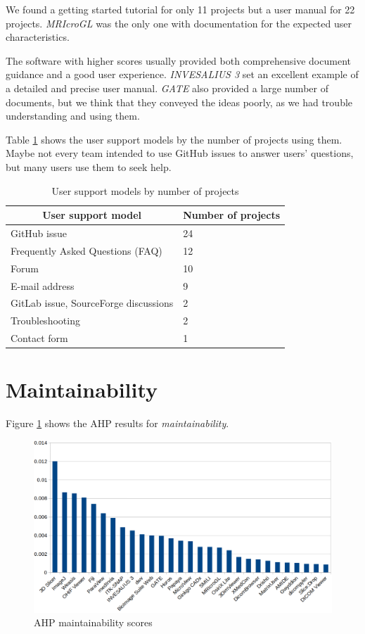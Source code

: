 We found a getting started tutorial for only 11 projects but a user manual for 22 projects. \textit{MRIcroGL} was the only one with documentation for the expected user characteristics.

The software with higher scores usually provided both comprehensive document guidance and a good user experience. \textit{INVESALIUS 3} set an excellent example of a detailed and precise user manual. \textit{GATE} also provided a large number of documents, but we think that they conveyed the ideas poorly, as we had trouble understanding and using them.
 
Table \ref{tab_user_support_model} shows the user support models by the number of projects using them. Maybe not every team intended to use GitHub issues to answer users' questions, but many users use them to seek help.

\begin{table}[H]
\centering
\begin{tabular}{ll}
\hline
\multicolumn{1}{c}{User support model} & Number of projects \\ \hline
GitHub issue & 24 \\
Frequently Asked Questions (FAQ) & 12 \\
Forum & 10 \\
E-mail address & 9 \\
GitLab issue, SourceForge discussions & 2 \\
Troubleshooting & 2 \\
Contact form & 1 \\ \hline
\end{tabular}
\caption{\label{tab_user_support_model}User support models by number of projects}
\end{table}

\section{Maintainability}
\label{sec_score_maintainability}
Figure \ref{fg_maintainability_scores} shows the AHP results for \textit{maintainability}. 

\begin{figure}[H]
\includegraphics[scale=0.38]{figures/maintainability_scores.png}
\caption{AHP maintainability scores}
\label{fg_maintainability_scores}
\end{figure}

